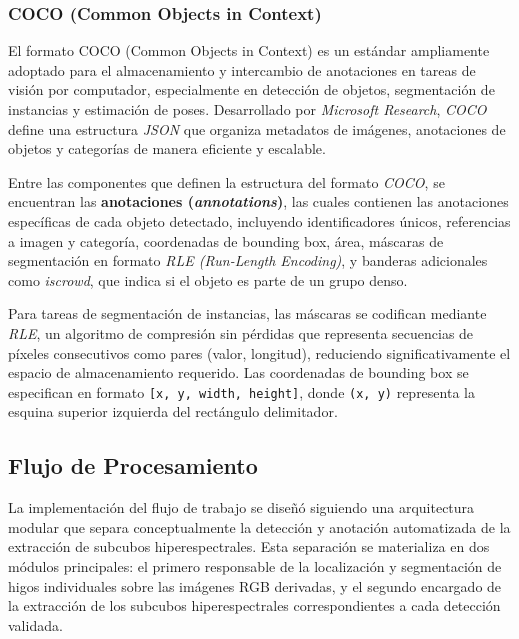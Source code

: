 \subsubsection{COCO (Common Objects in Context)}
El formato COCO (Common Objects in Context) \cite{lin2015microsoftcococommonobjects} es un estándar ampliamente adoptado para el almacenamiento y intercambio de anotaciones en tareas de visión por computador, especialmente en detección de objetos, segmentación de instancias y estimación de poses. Desarrollado por \emph{Microsoft Research},  \emph{COCO} define una estructura \emph{JSON} \cite{crockford2006application} que organiza metadatos de imágenes, anotaciones de objetos y categorías de manera eficiente y escalable.

\vspace{5mm}

Entre las componentes que definen la estructura del formato \emph{COCO}, se encuentran las \textbf{anotaciones (\emph{annotations})}, las cuales contienen las anotaciones específicas de cada objeto detectado, incluyendo identificadores únicos, referencias a imagen y categoría, coordenadas de bounding box, área, máscaras de segmentación en formato \emph{RLE (Run-Length Encoding)}, y banderas adicionales como \emph{iscrowd}, que indica si el objeto es parte de un grupo denso.

\vspace{5mm}

Para tareas de segmentación de instancias, las máscaras se codifican mediante \emph{RLE}, un algoritmo de compresión sin pérdidas que representa secuencias de píxeles consecutivos como pares (valor, longitud), reduciendo significativamente el espacio de almacenamiento requerido. Las coordenadas de bounding box se especifican en formato \texttt{[x, y, width, height]}, donde \texttt{(x, y)} representa la esquina superior izquierda del rectángulo delimitador.


\subsection{Flujo de Procesamiento}

La implementación del flujo de trabajo se diseñó siguiendo una arquitectura modular que separa conceptualmente la detección y anotación automatizada de la extracción de subcubos hiperespectrales. Esta separación se materializa en dos módulos principales: el primero responsable de la localización y segmentación de higos individuales sobre las imágenes RGB derivadas, y el segundo encargado de la extracción de los subcubos hiperespectrales correspondientes a cada detección validada.

